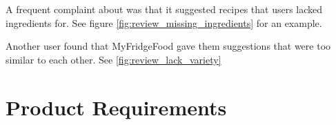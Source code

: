 A frequent complaint about \cite{myfridgefood_myfridgefood_nodate} was that it suggested
recipes that users lacked ingredients for. See figure \ref{fig:review_missing_ingredients} for an example.

Another user found that MyFridgeFood gave them suggestions that were too similar to each
other. See \ref{fig:review_lack_variety}

\section{Product Requirements}

\newcommand{\requirementtype}{FR}
\newcommand{\requirement}[3]{
    \requirementtype\stepcounter{functionalreqcounter}\arabic{functionalreqcounter}
        &
    #1
        &
    #2
        &
    #3
        \\\hline
}

